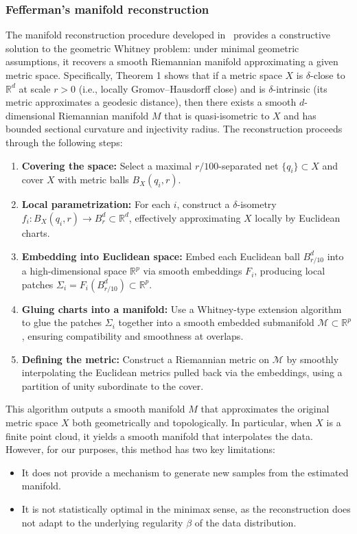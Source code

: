 \documentclass[10pt]{article}
\begin{document}
\subsubsection{Fefferman's manifold reconstruction}
The manifold reconstruction procedure developed in~\cite{fefferman2015reconstruction} provides a constructive solution to the geometric Whitney problem: under minimal geometric assumptions, it recovers a smooth Riemannian manifold approximating a given metric space. Specifically, Theorem 1 shows that if a metric space $X$ is $\delta$-close to $\mathbb{R}^d$ at scale $r>0$ (i.e., locally Gromov--Hausdorff close) and is $\delta$-intrinsic (its metric approximates a geodesic distance), then there exists a smooth $d$-dimensional Riemannian manifold $M$ that is quasi-isometric to $X$ and has bounded sectional curvature and injectivity radius.
The reconstruction proceeds through the following steps:
\begin{enumerate}
    \item \textbf{Covering the space:} Select a maximal $r/100$-separated net $\{q_i\} \subset X$ and cover $X$ with metric balls $B_X(q_i, r)$.
    
    \item \textbf{Local parametrization:} For each $i$, construct a $\delta$-isometry $f_i: B_X(q_i, r) \to B^d_r \subset \mathbb{R}^d$, effectively approximating $X$ locally by Euclidean charts.
    
    \item \textbf{Embedding into Euclidean space:} Embed each Euclidean ball $B^d_{r/10}$ into a high-dimensional space $\mathbb{R}^p$ via smooth embeddings $F_i$, producing local patches $\Sigma_i = F_i(B^d_{r/10}) \subset \mathbb{R}^p$.
    
    \item \textbf{Gluing charts into a manifold:} Use a Whitney-type extension algorithm to glue the patches $\Sigma_i$ together into a smooth embedded submanifold $\mathcal{M} \subset \mathbb{R}^p$, ensuring compatibility and smoothness at overlaps.
    
    \item \textbf{Defining the metric:} Construct a Riemannian metric on $\mathcal{M}$ by smoothly interpolating the Euclidean metrics pulled back via the embeddings, using a partition of unity subordinate to the cover.
\end{enumerate}

This algorithm outputs a smooth manifold $M$ that approximates the original metric space $X$ both geometrically and topologically. In particular, when $X$ is a finite point cloud, it yields a smooth manifold that interpolates the data. However, for our purposes, this method has two key limitations: 
\begin{itemize}
    \item It does not provide a mechanism to generate new samples from the estimated manifold.
    \item It is not statistically optimal in the minimax sense, as the reconstruction does not adapt to the underlying regularity $\beta$ of the data distribution.
\end{itemize}
\end{document}
